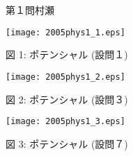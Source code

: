 \begin{question}{第１問}{村瀬}
\begin{center}
\texttt{[image: 2005phys1\_1.eps]}
\end{center}
\begin{center}
図 1: ポテンシャル (設問１)
\end{center}
\vspace{1em}

\begin{center}
\texttt{[image: 2005phys1\_2.eps]}
\end{center}
\begin{center}
図 2: ポテンシャル (設問３)
\end{center}
\vspace{1em}

\begin{center}
\texttt{[image: 2005phys1\_3.eps]}
\end{center}
\begin{center}
図 3: ポテンシャル (設問７)
\end{center}
\end{question}
